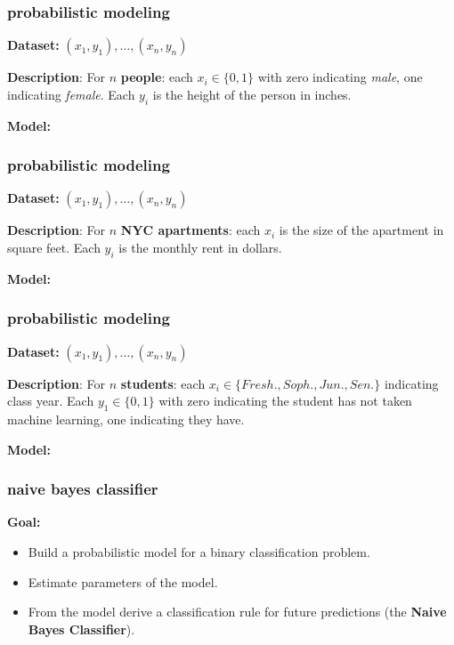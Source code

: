 \documentclass[handout,compress]{beamer}
\begin{document}
\begin{frame}[t]
	\frametitle{probabilistic modeling}
	\textbf{Dataset:} $(x_1, y_1), \ldots, (x_n,y_n)$
	
	\textbf{Description}: For $n$ \textbf{people}: each $x_i \in \{0,1\}$ with zero indicating \emph{male}, one indicating \emph{female}. Each $y_i$ is the height of the person in inches. 
	
	\textbf{Model:}
\end{frame}

\begin{frame}[t]
	\frametitle{probabilistic modeling}
	\textbf{Dataset:} $(x_1, y_1), \ldots, (x_n,y_n)$
	
	\textbf{Description}: For $n$ \textbf{NYC apartments}: each $x_i$ is the size of the apartment in square feet. Each $y_i$ is the monthly rent in dollars. 
	
	\textbf{Model:}
\end{frame}

\begin{frame}[t]
	\frametitle{probabilistic modeling}
	\textbf{Dataset:} $(x_1, y_1), \ldots, (x_n,y_n)$
	
	\textbf{Description}: For $n$ \textbf{students}: each $x_i \in \{Fresh.,Soph.,Jun.,Sen.\}$ indicating class year. Each $y_1 \in \{0,1\}$ with zero indicating the student has not taken machine learning, one indicating they have.
	
	\textbf{Model:}
\end{frame}

\begin{frame}
	\frametitle{naive bayes classifier}
	\textbf{Goal:}
	\begin{itemize}
		\item Build a probabilistic model for a binary classification problem.
		\item Estimate parameters of the model.
		\item From the model derive a classification rule for future predictions (the \alert{\textbf{Naive Bayes Classifier}}).
	\end{itemize}
\end{frame}
\end{document}
